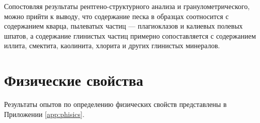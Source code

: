 Сопостовляя результаты рентгено-структурного анализа и гранулометрического, 
можно прийти к выводу, что содержание песка в образцах соотносится с 
содержанием кварца, пылеватых частиц --- плагиоклазов и калиевых
полевых шпатов, а содержание глинистых частиц примерно сопоставляется с 
содержанием иллита, смектита, каолинита, хлорита и других глинистых минералов.

\section{Физические свойства}

Результаты опытов по определению физических свойств представлены в 
Приложении \ref{app:phisics}. 

